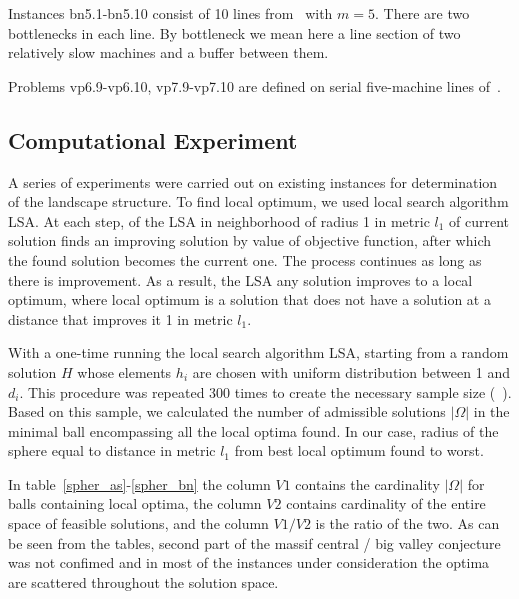 \documentclass{ifacconf}
\begin{document}
Instances bn5.1-bn5.10 consist of 10 lines from~\cite{eng1} with $m=5$. There are two bottlenecks in each line. By
bottleneck we mean here a line section of two relatively slow machines and a buffer
between them. 

Problems vp6.9-vp6.10, vp7.9-vp7.10 are defined on serial five-machine lines of~\cite{vp}. 


\subsection{Computational Experiment} \label{subsec:experiment}

A series of experiments were carried out on existing instances for
determination of the landscape structure. 
To find local optimum, we used local search algorithm LSA. At each step, of the LSA in neighborhood of radius 1 in metric $l_1$ of current solution finds 
an improving solution by value of  objective function, after which the found solution becomes the current one.
The process continues as long as there is improvement.
  As a result, the LSA
any solution improves to a local optimum, where local optimum is a solution that does not have a solution at a distance that improves it
1 in metric $l_1$.

With a one-time
running the local search algorithm LSA, starting from a random solution $H$ whose elements $h_i$ are chosen with
uniform distribution between 1 and $d_i$.
This procedure was repeated 300 times to create the necessary
sample size (~\cite{Boese}). Based on this sample, we calculated the
number of admissible solutions $|\Omega |$ in the minimal ball encompassing all the
local optima found. In our case, radius of the sphere equal to distance in metric $l_1$ from best local optimum found to worst.

In table~\ref{spher_as}-\ref{spher_bn} the column $V1$ contains the cardinality $| \Omega |$ for balls containing
local optima, the column $V2$ contains cardinality of the entire space of feasible
solutions, and the column $V1/V2$ is the ratio of the two.
As can be seen from the tables, second part of the massif central / big valley conjecture was not confimed and in most of the instances under consideration
the optima are scattered throughout the solution space.
\end{document}
